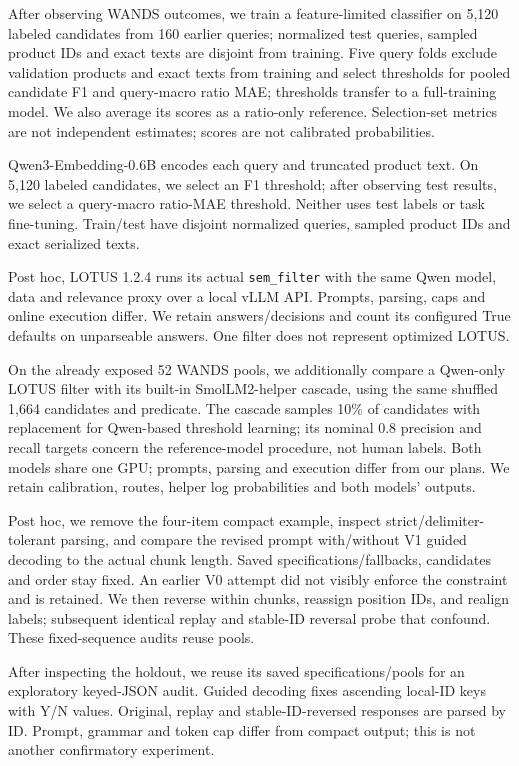 \documentclass[conference]{IEEEtran}
\begin{document}
After observing WANDS outcomes, we train a feature-limited classifier on 5,120 labeled candidates from 160 earlier queries; normalized test queries, sampled product IDs and exact texts are disjoint from training. Five query folds exclude validation products and exact texts from training and select thresholds for pooled candidate F1 and query-macro ratio MAE; thresholds transfer to a full-training model. We also average its scores as a ratio-only reference. Selection-set metrics are not independent estimates; scores are not calibrated probabilities.

Qwen3-Embedding-0.6B \cite{qwen_embed} encodes each query and truncated product text. On 5,120 labeled candidates, we select an F1 threshold; after observing test results, we select a query-macro ratio-MAE threshold. Neither uses test labels or task fine-tuning. Train/test have disjoint normalized queries, sampled product IDs and exact serialized texts.

Post hoc, LOTUS 1.2.4 runs its actual \texttt{sem\_filter} with the same Qwen model, data and relevance proxy over a local vLLM API. Prompts, parsing, caps and online execution differ. We retain answers/decisions and count its configured True defaults on unparseable answers. One filter does not represent optimized LOTUS.

On the already exposed 52 WANDS pools, we additionally compare a Qwen-only LOTUS filter with its built-in SmolLM2-helper cascade, using the same shuffled 1,664 candidates and predicate. The cascade samples 10\% of candidates with replacement for Qwen-based threshold learning; its nominal 0.8 precision and recall targets concern the reference-model procedure, not human labels. Both models share one GPU; prompts, parsing and execution differ from our plans. We retain calibration, routes, helper log probabilities and both models' outputs.

Post hoc, we remove the four-item compact example, inspect strict/delimiter-tolerant parsing, and compare the revised prompt with/without V1 guided decoding to the actual chunk length. Saved specifications/fallbacks, candidates and order stay fixed. An earlier V0 attempt did not visibly enforce the constraint and is retained. We then reverse within chunks, reassign position IDs, and realign labels; subsequent identical replay and stable-ID reversal probe that confound. These fixed-sequence audits reuse pools.

After inspecting the holdout, we reuse its saved specifications/pools for an exploratory keyed-JSON audit. Guided decoding fixes ascending local-ID keys with Y/N values. Original, replay and stable-ID-reversed responses are parsed by ID. Prompt, grammar and token cap differ from compact output; this is not another confirmatory experiment.
\end{document}
